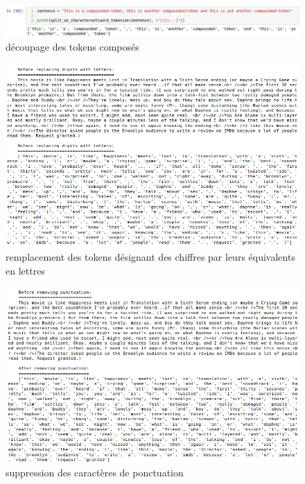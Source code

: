 \documentclass[12pt,a4paper]{report}
\theoremstyle{definition}
\begin{document}
\begin{appendices}
\begin{figure}[!ht]
  \centering
  \includegraphics[scale=0.45]{images/snapshots/preprocessing/after_split_characterset.png}
  \caption{découpage des tokens composés}
  \label{fig:after_split_characterset}
\end{figure}

\begin{figure}[!ht]
  \centering
  \includegraphics[scale=0.5]{images/snapshots/preprocessing/replace_numbers.png}
  \caption{remplacement des tokens désignant des chiffres par leurs équivalents en lettres}
  \label{fig:replace_numbers}
\end{figure}

\begin{figure}[!ht]
  \centering
  \includegraphics[scale=0.5]{images/snapshots/preprocessing/remove_punctuation.png}
  \caption{suppression des caractères de ponctuation}
  \label{fig:remove_punctuation}
\end{figure}


\end{appendices}
\end{document}
